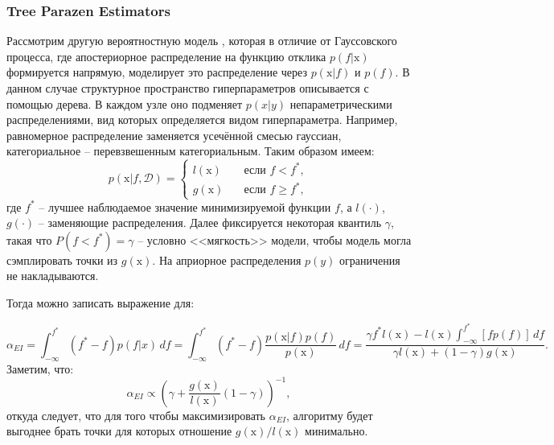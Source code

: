\documentclass[12pt,fleqn]{article}
\DeclareMathOperator*{\E}{\mathbb{E}}
\begin{document}
\subsubsection{Tree Parazen Estimators}

Рассмотрим другую вероятностную модель \cite{NIPS2011_4443}, которая в отличие от Гауссовского процесса, где апостериорное распределение на  функцию отклика $p(f|\boldsymbol{\mathrm{x}})$ формируется напрямую, моделирует это распределение через $p(\boldsymbol{\mathrm{x}}|f)$ и $p(f)$. В данном случае структурное пространство гиперпараметров описывается с помощью дерева. В каждом узле оно подменяет $p(x|y)$ непараметрическими распределениями, вид которых определяется видом гиперпараметра. Например, равномерное распределение заменяется усечённой смесью гауссиан, категориальное -- перевзвешенным категориальным. Таким образом имеем:
$$
    p(\boldsymbol{\mathrm{x}}|f, \mathcal{D}) = \begin{cases}
        l(\boldsymbol{\mathrm{x}}) \quad &\text{если } f < f^{*}, \\
        g(\boldsymbol{\mathrm{x}}) \quad &\text{если } f \geqslant f^{*},
    \end{cases}
$$
где $f^{*}$ -- лучшее наблюдаемое значение минимизируемой функции $f$, а $l(\cdot)$, $g(\cdot)$ -- заменяющие распределения. Далее фиксируется некоторая квантиль $\gamma$, такая что $P(f < f^{*}) = \gamma$ -- условно <<мягкость>> модели, чтобы модель могла сэмплировать точки из $g(\boldsymbol{\mathrm{x}})$. На априорное распределения $p(y)$ ограничения не накладываются. 

Тогда можно записать выражение для:

\begin{equation*}
    \alpha_{EI} = \int_{-\infty}^{f^{*}} (f^{*} - f) p(f|x)\, df =  \int_{-\infty}^{f^{*}} (f^{*} - f) \frac{p(\boldsymbol{\mathrm{x}} | f) p(f)}{p(\boldsymbol{\mathrm{x}})} \,df = \frac{\gamma f^{*}l(\boldsymbol{\mathrm{x}}) - l(\boldsymbol{\mathrm{x}}) \int_{-\infty}^{f^{*}} [fp(f)] \,df}{\gamma l(\boldsymbol{\mathrm{x}}) + (1-\gamma)g(\boldsymbol{\mathrm{x}})}.
\end{equation*}
Заметим, что:
$$
    \alpha_{EI} \propto \left(\gamma + \frac{g(\boldsymbol{\mathrm{x}})}{l(\boldsymbol{\mathrm{x}})}(1-\gamma)\right)^{-1},
$$
откуда следует, что для того чтобы максимизировать $\alpha_{EI}$, алгоритму будет выгоднее брать точки для которых отношение $g(\boldsymbol{\mathrm{x}}) / l(\boldsymbol{\mathrm{x}})$ минимально. 

\end{document}

